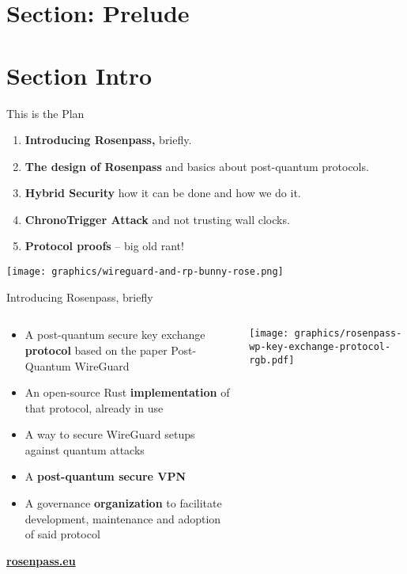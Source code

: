 \section{Section: Prelude}

\section{Section Intro}



\begin{frame}[s]{This is the Plan}
  \begin{enumerate}
   \setlength{\itemsep}{1ex plus 1 fil}
    \item \textbf{Introducing Rosenpass,} briefly.
    \item \textbf{The design of Rosenpass} and basics about post-quantum protocols.
    \item \textbf{Hybrid Security} how it can be done and how we do it.
    \item \textbf{ChronoTrigger Attack} and not trusting wall clocks.
    \item \textbf{Protocol proofs} – big old rant!
  \end{enumerate}

  \begin{center}
    \texttt{[image: graphics/wireguard-and-rp-bunny-rose.png]}
  \end{center}
\end{frame}



\begin{frame}{Introducing Rosenpass, briefly}
  \begin{columns}[fullwidth,c]

    \begin{column}{.5\linewidth}
      \begin{itemize}
        \item A post-quantum secure key exchange \textbf{protocol}
          {\small based on the paper Post-Quantum WireGuard\citePqwg}
        \item An open-source Rust \textbf{implementation} of that protocol, already in use
        \item A way to secure WireGuard setups against quantum attacks
        \item A \textbf{post-quantum secure VPN}
        \item A governance \textbf{organization} to facilitate development, maintenance and adoption of said protocol
      \end{itemize}
      \vspace{2em}
      \textbf{\href{https://rosenpass.eu}{rosenpass.eu}}
    \end{column}%

    \begin{column}{.5\linewidth}
      \texttt{[image: graphics/rosenpass-wp-key-exchange-protocol-rgb.pdf]}
    \end{column}

  \end{columns}
\end{frame}
